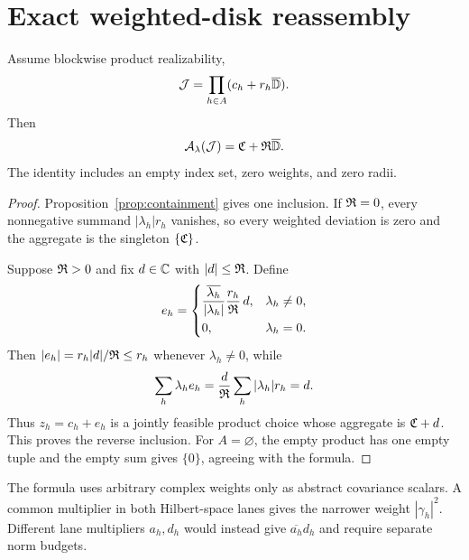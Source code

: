 \section{Exact weighted-disk reassembly}

\begin{theorem}\label{thm:disk}
Assume blockwise product realizability,
\[
 \mathcal J=\prod_{h\in A}(c_h+r_h\overline{\mathbb{D}}).
\]
Then
\[
 \mathcal A_\lambda(\mathcal J)=\mathfrak{C}+\mathfrak{R}\overline{\mathbb{D}}.
\]
The identity includes an empty index set, zero weights, and zero radii.
\end{theorem}

\begin{proof}
Proposition~\ref{prop:containment} gives one inclusion.  If $\mathfrak{R}=0$, every
nonnegative summand $|\lambda_h|r_h$ vanishes, so every weighted deviation is
zero and the aggregate is the singleton $\{\mathfrak{C}\}$.

Suppose $\mathfrak{R}>0$ and fix $d\in\mathbb{C}$ with $|d|\le\mathfrak{R}$.  Define
\[
 e_h=
 \begin{cases}
 \displaystyle
 \frac{\overline{\lambda_h}}{|\lambda_h|}
 \frac{r_h}{\mathfrak{R}}\,d,&\lambda_h\ne0,\\[7pt]
 0,&\lambda_h=0.
 \end{cases}
\]
Then $|e_h|=r_h|d|/\mathfrak{R}\le r_h$ whenever $\lambda_h\ne0$, while
\[
 \sum_h\lambda_he_h
 =\frac d{\mathfrak{R}}\sum_h|\lambda_h|r_h=d.
\]
Thus $z_h=c_h+e_h$ is a jointly feasible product choice whose aggregate is
$\mathfrak{C}+d$.  This proves the reverse inclusion.  For $A=\varnothing$, the
empty product has one empty tuple and the empty sum gives $\{0\}$, agreeing
with the formula.
\end{proof}

The formula uses arbitrary complex weights only as abstract covariance
scalars.  A common multiplier in both Hilbert-space lanes gives the narrower
weight $|\gamma_h|^2$.  Different lane multipliers $a_h,d_h$ would instead
give $\overline{a_h}d_h$ and require separate norm budgets.
